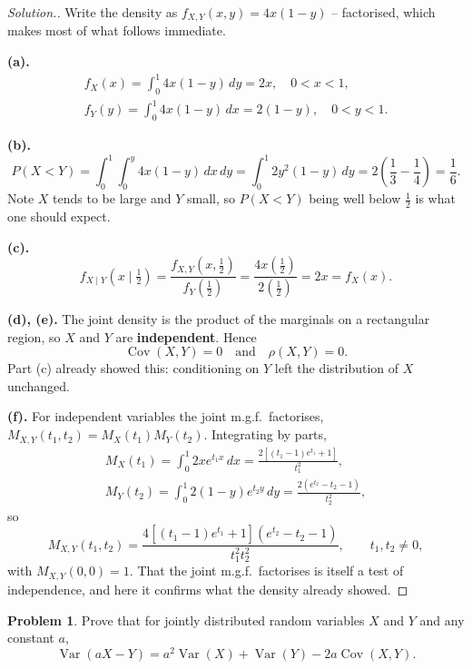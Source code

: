 \documentclass[12pt,a4paper]{report}
\theoremstyle{definition}
\theoremstyle{plain}
\theoremstyle{definition}
\newtheorem{problemx}{Problem}[section]
\newenvironment{problem}{\begin{problemx}}{\end{problemx}}
\newenvironment{solution}
  {\renewcommand{\qedsymbol}{}\begin{proof}[\textit{Solution}.]}
  {\end{proof}}
\begin{document}
\begin{solution}
Write the density as $f_{X,Y}(x,y) = 4x(1-y)$ -- factorised, which makes most of what
follows immediate.

\textbf{(a).}
\begin{gather*}
f_X(x) = \int_0^1 4x(1-y)\,dy = 2x,\quad 0<x<1,\\
f_Y(y) = \int_0^1 4x(1-y)\,dx = 2(1-y),\quad 0<y<1.
\end{gather*}

\textbf{(b).} \[P(X<Y) = \int_0^1\!\!\int_0^{y}4x(1-y)\,dx\,dy
 = \int_0^1 2y^{2}(1-y)\,dy = 2\left(\frac13-\frac14\right) = \frac{1}{6}.\]
Note $X$ tends to be large and $Y$ small, so $P(X<Y)$ being well below $\tfrac12$ is
what one should expect.

\textbf{(c).} \[f_{X\mid Y}\!\left(x\mid \tfrac12\right) = \frac{f_{X,Y}(x,\tfrac12)}{f_Y(\tfrac12)}
 = \frac{4x\left(\tfrac12\right)}{2\left(\tfrac12\right)} = 2x = f_X(x).\]

\textbf{(d), (e).} The joint density is the product of the marginals on a rectangular
region, so $X$ and $Y$ are \textbf{independent}. Hence
\[\operatorname{Cov}(X,Y) = 0 \quad\text{and}\quad \rho(X,Y) = 0.\]
Part (c) already showed this: conditioning on $Y$ left the distribution of $X$ unchanged.

\textbf{(f).} For independent variables the joint m.g.f.\ factorises,
$M_{X,Y}(t_1,t_2) = M_X(t_1)M_Y(t_2)$. Integrating by parts,
\begin{gather*}
M_X(t_1) = \int_0^1 2xe^{t_1x}\,dx = \frac{2\left[(t_1-1)e^{t_1}+1\right]}{t_1^{2}},\\
M_Y(t_2) = \int_0^1 2(1-y)e^{t_2y}\,dy = \frac{2\left(e^{t_2}-t_2-1\right)}{t_2^{2}},
\end{gather*}
so
\[M_{X,Y}(t_1,t_2) = \frac{4\left[(t_1-1)e^{t_1}+1\right]\left(e^{t_2}-t_2-1\right)}
 {t_1^{2}t_2^{2}}, \qquad t_1,t_2\neq 0,\]
with $M_{X,Y}(0,0) = 1$. That the joint m.g.f.\ factorises is itself a test of
independence, and here it confirms what the density already showed.
\end{solution}

\begin{problem}
Prove that for jointly distributed random variables $X$ and $Y$ and any constant $a$,
\[\operatorname{Var}(aX-Y) = a^{2}\operatorname{Var}(X)+\operatorname{Var}(Y)
 -2a\operatorname{Cov}(X,Y).\]
\end{problem}
\end{document}
